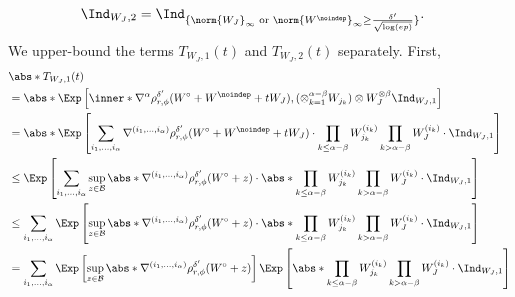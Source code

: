 \documentclass[aos]{imsart}
\begin{document}
\begin{appendix}
\begin{equation*}
\begin{aligned}
    \Ind_{W_J,2} & = \Ind_{\{\norm{W_J}_\infty \text{ or } \norm{W^{\noindep}}_\infty \geq \frac{\delta'}{\sqrt{\log(ep)}}\}}.
\end{aligned}
\end{equation*}
We upper-bound the terms $T_{W_J,1}(t)$ and $T_{W_J,2}(t)$ separately. First,
\begin{equation} \label{eq:decompose_T_1}
\begin{aligned}
    & \abs*{T_{W_J,1}(t)} \\
    & = \abs*{ \Exp\left[
        \inner*{\nabla^\alpha \rho_{r,\phi}^{\delta'} (W^\circ + W^\noindep + t W_J), 
        (\otimes_{k=1}^{\alpha-\beta} W_{j_k}) \otimes W_J^{\otimes \beta}} \Ind_{W_J, 1}
    \right] } \\
    & = \abs*{ \Exp\left[
        \sum_{i_1,\dots,i_\alpha} \nabla^{(i_1,\dots,i_\alpha)} \rho_{r,\phi}^{\delta'} (W^\circ + W^\noindep + t W_J)
        \cdot \prod_{k \leq \alpha-\beta} W_{j_k}^{(i_k)} 
        \prod_{k > \alpha-\beta} W_J^{(i_k)} \cdot \Ind_{W_J,1}\right] } \\
    & \leq \Exp\left[
        \sum_{i_1,\dots,i_\alpha} \sup_{z \in \mathcal{B}}\abs*{\nabla^{(i_1,\dots,i_\alpha)} \rho_{r,\phi}^{\delta'} (W^\circ + z)}
        \cdot \abs*{\prod_{k \leq \alpha-\beta} W_{j_k}^{(i_k)} 
        \prod_{k > \alpha-\beta} W_J^{(i_k)}} 
        \cdot \Ind_{W_J,1} 
    \right] \\
    & \leq \sum_{i_1,\dots,i_\alpha} \Exp\left[ 
        \sup_{z \in \mathcal{B}}\abs*{\nabla^{(i_1,\dots,i_\alpha)} \rho_{r,\phi}^{\delta'} (W^\circ + z)}
        \cdot \abs*{\prod_{k \leq \alpha-\beta} W_{j_k}^{(i_k)} 
        \prod_{k > \alpha-\beta} W_J^{(i_k)}} 
        \cdot \Ind_{W_J,1} 
    \right] \\
    & = \sum_{i_1,\dots,i_\alpha} \Exp\left[ 
        \sup_{z \in \mathcal{B}}\abs*{\nabla^{(i_1,\dots,i_\alpha)} \rho_{r,\phi}^{\delta'} (W^\circ + z)}
    \right]
    \Exp\left[
        \abs*{\prod_{k \leq \alpha-\beta} W_{j_k}^{(i_k)} 
        \prod_{k > \alpha-\beta} W_J^{(i_k)}} 
        \cdot \Ind_{W_J,1} 
    \right] \\

\end{aligned}
\end{equation}
\end{appendix}
\end{document}
